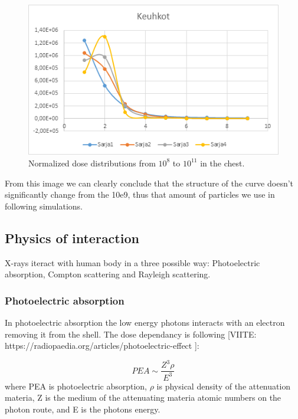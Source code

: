\documentclass[fleqn,10pt]{SelfArx} %
\begin{document}
\begin{figure}[!hbt]\centering
\includegraphics[width=\linewidth]{PhotonNumber}
\caption{Normalized dose distributions from $10^8$ to $10^{11}$ in the chest.}
\label{fig:PhotonNumber}
\end{figure}


From this image we can clearly conclude that the structure of the curve doesn't significantly change from the 10e9, thus that amount of particles we use in following simulations.

\subsection{Physics of interaction}

X-rays iteract with human body in a three possible way: Photoelectric absorption, Compton scattering and Rayleigh scattering.

\subsubsection{Photoelectric absorption}
In photoelectric absorption the low energy photons interacts with an electron removing it from the shell. The dose dependancy is following [VIITE: https://radiopaedia.org/articles/photoelectric-effect ]: 

\begin{equation}
\label{eq:PEA}
PEA \sim \frac{Z^3 \rho}{E^3}
\end{equation}
where PEA is photoelectric absorption, $\rho$ is physical density of the attenuation materia, Z is the medium of the attenuating materia atomic numbers on the photon route, and E is the photons energy.
\end{document}
